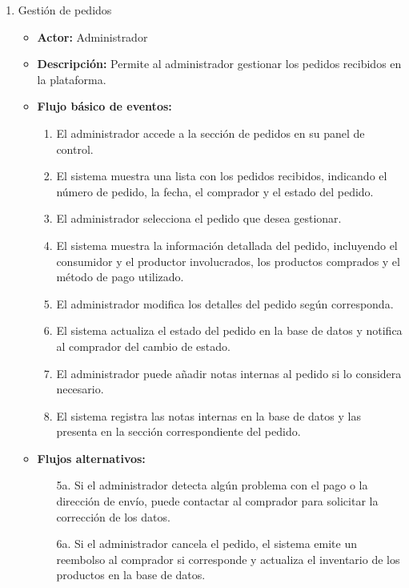 \begin{enumerate}[CU-1:]
\item{Gestión de pedidos}
\begin{itemize}
	\item \textbf{Actor:} Administrador
	\item \textbf{Descripción:} Permite al administrador gestionar los pedidos recibidos en la plataforma.
	\item \textbf{Flujo básico de eventos:}
	\begin{enumerate}[1:]
		\item El administrador accede a la sección de pedidos en su panel de control.
		\item El sistema muestra una lista con los pedidos recibidos, indicando el número de pedido, la fecha, el comprador y el estado del pedido.
		\item El administrador selecciona el pedido que desea gestionar.
		\item El sistema muestra la información detallada del pedido, incluyendo el consumidor y el productor involucrados, los productos comprados y el método de pago utilizado.
		\item El administrador modifica los detalles del pedido según corresponda.
		\item El sistema actualiza el estado del pedido en la base de datos y notifica al comprador del cambio de estado.
		\item El administrador puede añadir notas internas al pedido si lo considera necesario.
		\item El sistema registra las notas internas en la base de datos y las presenta en la sección correspondiente del pedido.
		\end{enumerate}
	\item \textbf{Flujos alternativos:}
		\begin{itemize}
		\item [5a.] Si el administrador detecta algún problema con el pago o la dirección de envío, puede contactar al comprador para solicitar la corrección de los datos.
		\item [6a.] Si el administrador cancela el pedido, el sistema emite un reembolso al comprador si corresponde y actualiza el inventario de los productos en la base de datos.
		\end{itemize}
\end{itemize}


\end{enumerate}
